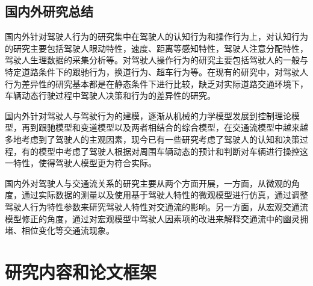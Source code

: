 \subsection{国内外研究总结}

国内外针对驾驶人行为的研究集中在驾驶人的认知行为和操作行为上，对认知行为的研究主要包括驾驶人眼动特性，速度、距离等感知特性，驾驶人注意分配特性，驾驶人生理数据的采集分析等。对驾驶人操作行为的研究主要包括驾驶人的一般与特定道路条件下的跟驰行为，换道行为、超车行为等。在现有的研究中，对驾驶人行为差异性的研究基本都是在静态条件下进行比较，缺乏对实际道路交通环境下，车辆动态行驶过程中驾驶人决策和行为的差异性的研究。

国内外针对驾驶人与驾驶行为的建模，逐渐从机械的力学模型发展到控制理论模型，再到跟驰模型和变道模型以及两者相结合的综合模型，在交通流模型中越来越多地考虑到了驾驶人的主观因素，现今已有一些研究考虑了驾驶人的认知和决策过程，有的模型中考虑了驾驶人根据对周围车辆动态的预计和判断对车辆进行操控这一特性，使得驾驶人模型更为符合实际。

国内外对驾驶人与交通流关系的研究主要从两个方面开展，一方面，从微观的角度，通过实际数据的测量以及使用基于驾驶人特性的微观模型进行仿真，通过调整驾驶人行为特性参数来研究驾驶人特性对交通流的影响。另一方面，从宏观交通流模型修正的角度，通过对宏观模型中驾驶人因素项的改进来解释交通流中的幽灵拥堵、相位变化等交通流现象。%

\section{研究内容和论文框架}


